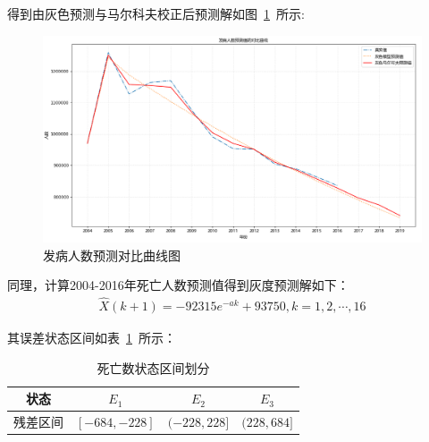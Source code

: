 \documentclass{whutmod}
\begin{document}
	  得到由灰色预测与马尔科夫校正后预测解如图~\ref{afd}~所示:
    \begin{figure}[H]
	\centering
	\includegraphics[width=\textwidth]{figures/f.png}
	\caption{发病人数预测对比曲线图}\label{afd}
\end{figure}


	  同理，计算2004-2016年死亡人数预测值得到灰度预测解如下：
	  \begin{gather}
	  	  \widehat{X}(k+1)=-92315e^{-ak}+93750,k=1,2,\cdots,16
	  \end{gather}

	  

	  其误差状态区间如表~\ref{ss}~所示：
	    \begin{table}[H]
	  	\centering\caption{死亡数状态区间划分}\label{ss}
	  	\begin{tabular}{cccc}
	  		\toprule[1.5pt]
	  		\multicolumn{1}{m{2cm}}{\centering 状态}
	  		& \multicolumn{1}{m{3cm}}{\centering $E_{1}$}
	  		& \multicolumn{1}{m{3cm}}{\centering $E_{2}$}
	  		& \multicolumn{1}{m{3cm}}{\centering $E_{3}$}
	  		\\
	  		\midrule[0.5pt]
	  		残差区间 &  $[-684,-228]$  &$(-228,228]$ & $(228,684]$   \\ 
	  		\bottomrule[1.5pt]	
	  	\end{tabular}
	  \end{table}
	  
\end{document}
